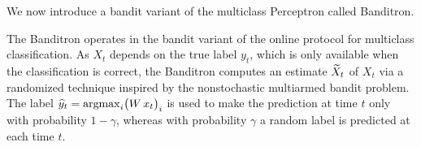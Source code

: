 We now introduce a bandit variant of the multiclass Perceptron called Banditron.
\begin{center}
\end{center}
The Banditron operates in the bandit variant of the online protocol for multiclass classification. As $X_t$ depends on the true label $y_t$, which is only available when the classification is correct, the Banditron computes an estimate $\widetilde{X}_t$ of $X_t$ via a randomized technique inspired by the nonstochastic multiarmed bandit problem. The label $\widehat{y}_t = \mathop{\mathrm{argmax}}_i \bigl(W\,x_t\bigr)_i$ is used to make the prediction at time $t$ only with probability $1-\gamma$, whereas with probability $\gamma$ a random label is predicted at each time $t$.

